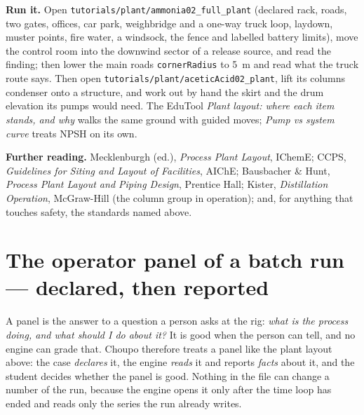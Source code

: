 \documentclass[11pt,a4paper]{article}
\begin{document}
\textbf{Run it.} Open \texttt{tutorials/plant/ammonia02\_full\_plant}
(declared rack, roads, two gates, offices, car park, weighbridge and a
one-way truck loop, laydown, muster points, fire water, a windsock, the
fence and labelled battery limits), move the control room into the
downwind sector of a release source, and read the finding; then lower
the main road\textquotesingle s \texttt{cornerRadius} to 5~m and read what
the truck route says. Then open
\texttt{tutorials/plant/aceticAcid02\_plant}, lift its
column\textquotesingle s condenser onto a structure, and work out by hand
the skirt and the drum elevation its pumps would need. The EduTool
\emph{Plant layout: where each item stands, and why} walks the same
ground with guided moves; \emph{Pump vs system curve} treats NPSH on its
own.

\textbf{Further reading.} Mecklenburgh (ed.), \emph{Process Plant
Layout}, IChemE; CCPS, \emph{Guidelines for Siting and Layout of
Facilities}, AIChE; Bausbacher \& Hunt, \emph{Process Plant Layout and
Piping Design}, Prentice Hall; Kister, \emph{Distillation Operation},
McGraw-Hill (the column group in operation); and, for anything that
touches safety, the standards named above.

\hypertarget{operator-panel}{%
\section{The operator panel of a batch run --- declared, then
reported}\label{operator-panel}\label{sec:operatorPanel}}

A panel is the answer to a question a person asks at the rig: \emph{what
is the process doing, and what should I do about it?} It is good when the
person can tell, and no engine can grade that. Choupo therefore treats a
panel like the plant layout above: the case \emph{declares} it, the engine
\emph{reads} it and reports \emph{facts} about it, and the student decides
whether the panel is good. Nothing in the file can change a number of the
run, because the engine opens it only after the time loop has ended and
reads only the series the run already writes.
\end{document}
